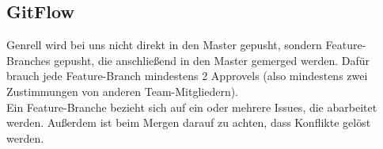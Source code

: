 \documentclass[11pt,a4paper]{report}
\begin{document}
\subsection{GitFlow}
Genrell wird bei uns nicht direkt in den Master gepusht, sondern Feature-Branches gepusht, die anschließend in den Master gemerged werden. Dafür brauch jede Feature-Branch mindestens 2 Approvels (also mindestens zwei Zustimmungen von anderen Team-Mitgliedern).\\
Ein Feature-Branche bezieht sich auf ein oder mehrere Issues, die abarbeitet werden. Außerdem ist beim Mergen darauf zu achten, dass Konflikte gelöst werden.
\end{document}
